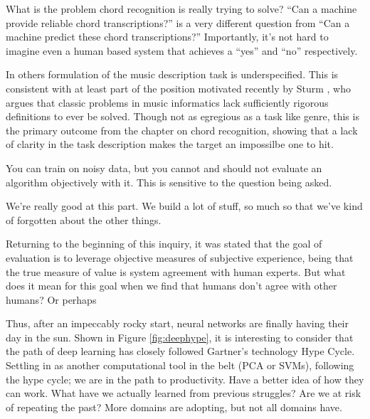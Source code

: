 What is the problem chord recognition is really trying to solve?
``Can a machine provide reliable chord transcriptions?'' is a very different question from ``Can a machine predict these chord transcriptions?''
Importantly, it's not hard to imagine even a human based system that achieves a ``yes'' and ``no'' respectively.

In others formulation of the music description task is underspecified.
This is consistent with at least part of the position motivated recently by Sturm \cite{}, who argues that classic problems in music informatics lack sufficiently rigorous definitions to ever be solved.
Though not as egregious as a task like genre, this is the primary outcome from the chapter on chord recognition, showing that a lack of clarity in the task description makes the target an impossilbe one to hit.

You can train on noisy data, but you cannot and should not evaluate an algorithm objectively with it.
This is sensitive to the question being asked.

We're really good at this part.
We build a lot of stuff, so much so that we've kind of forgotten about the other things.


Returning to the beginning of this inquiry, it was stated that the goal of evaluation is to leverage objective measures of subjective experience, being that the true measure of value is system agreement with human experts.
But what does it mean for this goal when we find that humans don't agree with other humans?
Or perhaps







\begin{figure}
\begin{centering}
\texttt{[image: deephype]}
\caption{\emph{Gartner Hype cycle of neural networks.}
\label{fig:deephype}
\end{centering}
\end{figure}

Thus, after an impeccably rocky start, neural networks are finally having their day in the sun.
Shown in Figure \ref{fig:deephype}, it is interesting to consider that the path of deep learning has closely followed Gartner's technology Hype Cycle.
Settling in as another computational tool in the belt (PCA or SVMs), following the hype cycle; we are in the path to productivity.
Have a better idea of how they can work.
What have we actually learned from previous struggles? Are we at risk of repeating the past?
More domains are adopting, but not all domains have.

